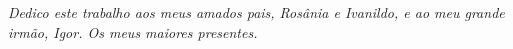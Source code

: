 \begin{dedicatoria}
   \vspace*{\fill}
   \centering
   \noindent
   \textit{Dedico este trabalho aos meus amados pais, Rosânia e Ivanildo, e ao meu grande irmão, Igor. Os meus maiores presentes.\\} \vspace*{\fill}
\end{dedicatoria}